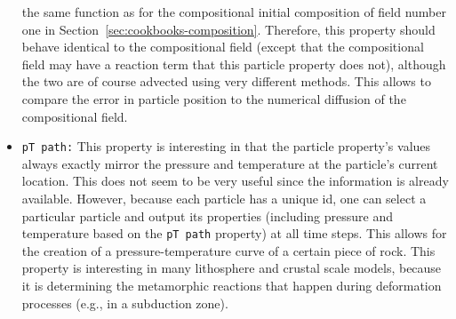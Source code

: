 \documentclass{article}
\begin{document}
\begin{itemize}
  the same function as for the compositional initial composition of
  field number one in
  Section~\ref{sec:cookbooks-composition}. Therefore, this property
  should behave identical to the compositional field (except that the
  compositional field may have a reaction term that this particle
  property does not), although the two are of course advected using
  very different methods. This allows to compare the error in particle
  position to the numerical diffusion of the compositional field.
\item \texttt{pT path:} This property is interesting in that the
  particle property's values always exactly mirror the pressure and
  temperature at the particle's current location. This does not seem
  to be very useful since the information is already
  available. However, because each particle has a unique id, one can
  select a particular particle and output its properties
  (including pressure and temperature based on the \texttt{pT path}
  property) at all time steps. This allows for the creation of a pressure-temperature curve of a certain piece of rock. This property is interesting in many lithosphere and crustal scale models, because it is determining the metamorphic reactions that happen during deformation processes (e.g., in a subduction zone).
\end{itemize}
\end{document}
